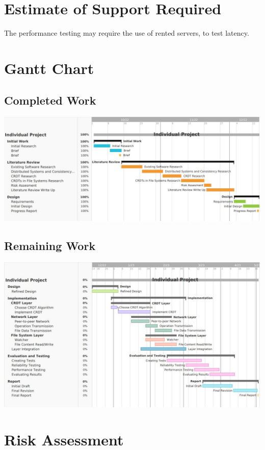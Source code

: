 \documentclass[12pt]{report}
\begin{document}
\section{Estimate of Support Required}
The performance testing may require the use of rented servers, to test latency.

\section{Gantt Chart}

\subsection{Completed Work}
\includegraphics[width=16cm]{completed.jpg}


\subsection{Remaining Work}
\begin{center}
    \includegraphics[width=16cm]{remaining.jpg}
\end{center}


\section{Risk Assessment}
\end{document}

